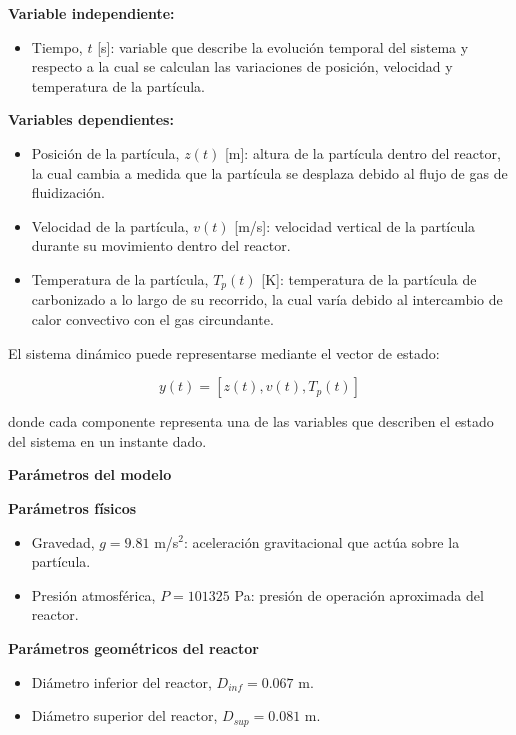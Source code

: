 \documentclass[11pt,stdletter,orderfromtodate,sigleft,twoside]{report}
\begin{document}
\textbf{Variable independiente:}

\begin{itemize}
\item Tiempo, $t$ [s]: variable que describe la evolución temporal del sistema y respecto a la cual se calculan las variaciones de posición, velocidad y temperatura de la partícula.
\end{itemize}

\textbf{Variables dependientes:} 

\begin{itemize}
\item Posición de la partícula, $z(t)$ [m]: altura de la partícula dentro del reactor, la cual cambia a medida que la partícula se desplaza debido al flujo de gas de fluidización.
\item Velocidad de la partícula, $v(t)$ [m/s]: velocidad vertical de la partícula durante su movimiento dentro del reactor.
\item Temperatura de la partícula, $T_p(t)$ [K]: temperatura de la partícula de carbonizado a lo largo de su recorrido, la cual varía debido al intercambio de calor convectivo con el gas circundante.
\end{itemize}

El sistema dinámico puede representarse mediante el vector de estado:

\[
y(t) = [z(t), v(t), T_p(t)]
\]

donde cada componente representa una de las variables que describen el estado del sistema en un instante dado.
\medskip


\textbf{Parámetros del modelo} 
\medskip

\textbf{Parámetros físicos}

\begin{itemize}
\item Gravedad, $g = 9.81$ m/s$^2$: aceleración gravitacional que actúa sobre la partícula.
\item Presión atmosférica, $P = 101325$ Pa: presión de operación aproximada del reactor.
\end{itemize}
\medskip


\textbf{Parámetros geométricos del reactor}

\begin{itemize}
\item Diámetro inferior del reactor, $D_{inf} = 0.067$ m.
\item Diámetro superior del reactor, $D_{sup} = 0.081$ m.

\end{itemize}
\end{document}
